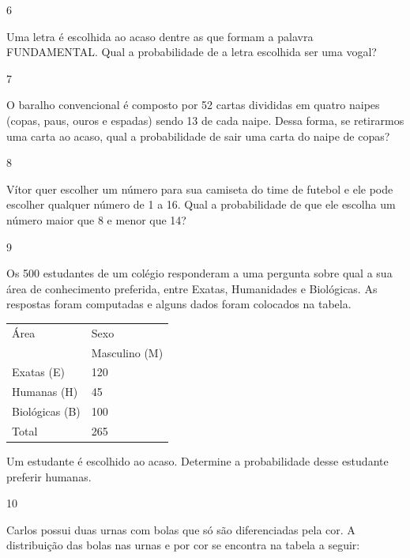 \begin{escolha}
\begin{escolha}

\num{6}

Uma letra é escolhida ao acaso dentre as que formam a palavra
FUNDAMENTAL. Qual a probabilidade de a letra escolhida ser uma vogal?


\num{7}

O baralho convencional é composto por 52 cartas divididas em quatro
naipes (copas, paus, ouros e espadas) sendo 13 de cada naipe. Dessa
forma, se retirarmos uma carta ao acaso, qual a probabilidade de sair
uma carta do naipe de copas?


\num{8}

Vítor quer escolher um número para sua camiseta do time de futebol e ele
pode escolher qualquer número de 1 a 16. Qual a probabilidade de que ele
escolha um número maior que 8 e menor que 14?


\num{9}

Os 500 estudantes de um colégio responderam a uma pergunta sobre qual a
sua área de conhecimento preferida, entre Exatas, Humanidades e
Biológicas. As respostas foram computadas e alguns dados foram colocados
na tabela.

\begin{longtable}[]{@{}ll@{}}
\toprule
Área & Sexo\tabularnewline
& Masculino (M)\tabularnewline
Exatas (E) & 120\tabularnewline
Humanas (H) & 45\tabularnewline
Biológicas (B) & 100\tabularnewline
Total & 265\tabularnewline
\bottomrule
\end{longtable}

Um estudante é escolhido ao acaso. Determine a probabilidade desse
estudante preferir humanas.


\num{10}

Carlos possui duas urnas com bolas que só são diferenciadas pela cor. A
distribuição das bolas nas urnas e por cor se encontra na tabela a
seguir:


\end{escolha}
\end{escolha}
